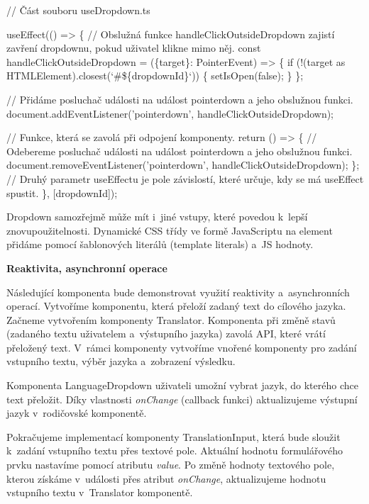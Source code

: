 \begin{prog}
// Část souboru useDropdown.ts

useEffect(() => \{
  // Obslužná funkce handleClickOutsideDropdown zajistí zavření dropdownu,
    pokud uživatel klikne mimo něj.
  const handleClickOutsideDropdown = (\{target\}: PointerEvent) => \{
    if (!(target as HTMLElement).closest(`#\$\{dropdownId\}`)) \{
      setIsOpen(false);
    \}
  \};

  // Přidáme posluchač události na událost pointerdown a jeho obslužnou funkci.
  document.addEventListener('pointerdown', handleClickOutsideDropdown);

  // Funkce, která se zavolá při odpojení komponenty.
  return () => \{
    // Odebereme posluchač události na událost
      pointerdown a jeho obslužnou funkci.
    document.removeEventListener('pointerdown', handleClickOutsideDropdown);
  \};
  // Druhý parametr useEffectu je pole závislostí, 
    které určuje, kdy se má useEffect spustit.
\}, [dropdownId]);
\end{prog}

Dropdown samozřejmě může mít i~jiné vstupy, které povedou k~lepší znovupoužitelnosti. 
Dynamické CSS třídy ve formě JavaScriptu na element přidáme pomocí šablonových literálů (template literals) a~JS hodnoty.

\begin{flushleft}
  \textbf{Reaktivita, asynchronní operace}
\end{flushleft}

Následující komponenta bude demonstrovat využití reaktivity a~asynchronních operací. Vytvoříme komponentu, která přeloží zadaný text do cílového jazyka. 
Začneme vytvořením komponenty Translator. Komponenta při změně stavů (zadaného textu uživatelem a~výstupního jazyka) zavolá API, které vrátí přeložený text.
V~rámci komponenty vytvoříme vnořené komponenty pro zadání vstupního textu, výběr jazyka a~zobrazení výsledku.

Komponenta LanguageDropdown uživateli umožní vybrat jazyk, do kterého chce text přeložit. 
Díky vlastnosti \emph{onChange} (callback funkci) aktualizujeme výstupní jazyk v~rodičovské komponentě. 

Pokračujeme implementací komponenty TranslationInput, která bude sloužit k~zadání vstupního textu přes textové pole. Aktuální hodnotu formulářového prvku nastavíme pomocí atributu \emph{value}.
Po změně hodnoty textového pole, kterou získáme v~události přes atribut \emph{onChange}, aktualizujeme hodnotu vstupního textu v~Translator komponentě.

